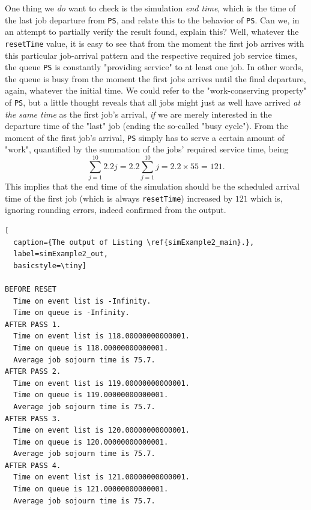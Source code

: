 \documentclass[12pt]{book}
\begin{document}
One thing we {\em do\/} want to check is the simulation {\em end time\/},
  which is the time of the last job departure from \lstinline|PS|,
  and relate this to the behavior of \lstinline|PS|.
Can we, in an attempt to partially verify the result found, explain this?
Well, whatever the \lstinline|resetTime| value,
  it is easy to see that from the moment the first job
  arrives with this particular job-arrival pattern
  and the respective required job service times,
  the queue \lstinline|PS|
  is constantly "providing service" to at least one job.
In other words, the queue is busy from the moment
  the first jobs arrives until the final departure,
  again, whatever the initial time.
We could refer to the "work-conserving property" of
  \lstinline|PS|, but a little thought reveals
  that all jobs might just as well have arrived
  {\em at the same time\/} as the first job's arrival,
  {\em if\/} we are merely interested in the departure time of
  the "last" job (ending the so-called "busy cycle").
From the moment of the first job's arrival,
  \lstinline|PS| simply has to serve
  a certain amount of "work",
  quantified by the summation of the jobs'
  required service time,
  being
\[
  \sum_{j=1}^{10} 2.2j = 2.2 \sum_{j=1}^{10} j = 2.2 \times 55 = 121.
\]
This implies that the end time of the simulation should
  be the scheduled arrival time of the first job
  (which is always \lstinline|resetTime|)
  increased by $121$
  which is,
  ignoring rounding errors,
  indeed confirmed from the output.

\begin{lstfloat}
\begin{lstlisting}[
  caption={The output of Listing \ref{simExample2_main}.},
  label=simExample2_out,
  basicstyle=\tiny]

BEFORE RESET
  Time on event list is -Infinity.
  Time on queue is -Infinity.
AFTER PASS 1.
  Time on event list is 118.00000000000001.
  Time on queue is 118.00000000000001.
  Average job sojourn time is 75.7.
AFTER PASS 2.
  Time on event list is 119.00000000000001.
  Time on queue is 119.00000000000001.
  Average job sojourn time is 75.7.
AFTER PASS 3.
  Time on event list is 120.00000000000001.
  Time on queue is 120.00000000000001.
  Average job sojourn time is 75.7.
AFTER PASS 4.
  Time on event list is 121.00000000000001.
  Time on queue is 121.00000000000001.
  Average job sojourn time is 75.7.

\end{lstlisting}
\end{lstfloat}
\end{document}
